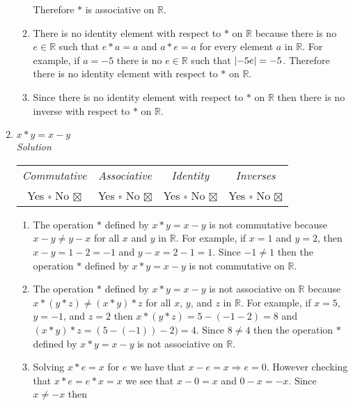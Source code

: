 \documentclass[12pt]{article}
\DeclarePairedDelimiter{\abs}{\lvert}{\rvert}
\begin{document}
\begin{enumerate}
\begin{enumerate}
                Therefore $*$ is associative on $\mathbb{R}$.	
              \item There is no identity element with respect to $*$ on $\mathbb{R}$ because there is 
                no $e \in \mathbb{R}$ such that $e * a = a$ and $a * e = a$ for every element $a$ 
                in $\mathbb{R}$. For example, if $a = -5$ there is no $e \in \mathbb{R}$ such that 
                $\abs{-5e} = -5$. Therefore there is no identity element with respect to $*$ on $\mathbb{R}$. 
              \item Since there is no identity element with respect to $*$ on $\mathbb{R}$ then there is no inverse with respect to $*$ on $\mathbb{R}$.
            \end{enumerate} 
          \item $x * y = x - y $ \\
            \medskip
            \textit{Solution}
            \medskip
            \begin{tabular}{c c c c}
              \textit{Commutative} & \textit{Associative} & \textit{Identity} & \textit{Inverses} \\
                Yes $\square$ No $\boxtimes$ & Yes $\square$ No $\boxtimes$ & Yes $\square$  No $\boxtimes$ & Yes $\square$ No $\boxtimes$ \\
            \end{tabular}
            \begin{enumerate}
              \item The operation $*$ defined by $x * y = x - y$ is not commutative because $x - y \neq y - x$ 
                for all $x$ and $y$ in $\mathbb{R}$. For example, if $x = 1$ and $y = 2$, then 
                $x - y = 1 - 2 = -1$ and $y - x = 2 - 1 = 1$. Since $-1 \neq 1$ then the operation 
                $*$ defined by $x * y = x - y$ is not commutative on $\mathbb{R}$.	
              \item The operation $*$ defined by $x * y = x - y$ is not associative on $\mathbb{R}$ because 
                $x * (y * z) \neq (x * y) * z$ for all $x$, $y$, and $z$ in $\mathbb{R}$. For example, 
                if $x = 5$, $y = -1$, and $z = 2$ then $x * (y * z) = 5-(-1-2) = 8$ and $(x * y) * z = (5 - (-1)) -2) = 4$. 
                Since $8 \neq 4$ then the operation $*$ defined by $x * y = x - y$ is not associative on $\mathbb{R}$.
              \item Solving $x * e = x$ for $e$ we have that $x - e = x \Rightarrow e = 0$. However checking 
                that $x * e = e * x = x$ we see that $x - 0 = x$ and $0 - x = -x$. Since $x \neq -x$ then 

\end{enumerate}
\end{enumerate}
\end{document}
